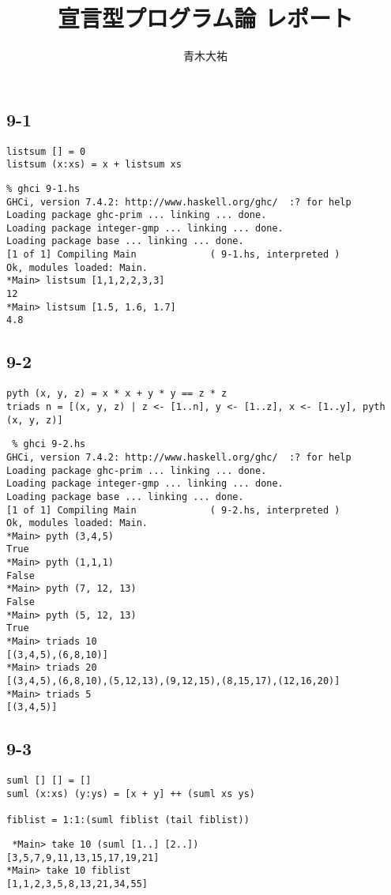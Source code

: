 \documentclass[a4paper]{jsarticle}
\author{青木大祐}
\title{宣言型プログラム論 レポート}
\begin{document}
\maketitle
\newpage
\subsection*{9-1}
\begin{lstlisting}
listsum [] = 0
listsum (x:xs) = x + listsum xs
\end{lstlisting}

\begin{lstlisting}
% ghci 9-1.hs 
GHCi, version 7.4.2: http://www.haskell.org/ghc/  :? for help
Loading package ghc-prim ... linking ... done.
Loading package integer-gmp ... linking ... done.
Loading package base ... linking ... done.
[1 of 1] Compiling Main             ( 9-1.hs, interpreted )
Ok, modules loaded: Main.
*Main> listsum [1,1,2,2,3,3]
12
*Main> listsum [1.5, 1.6, 1.7]
4.8
\end{lstlisting}

\subsection*{9-2}
\begin{lstlisting}
pyth (x, y, z) = x * x + y * y == z * z
triads n = [(x, y, z) | z <- [1..n], y <- [1..z], x <- [1..y], pyth (x, y, z)]
\end{lstlisting}

\begin{lstlisting}
 % ghci 9-2.hs
GHCi, version 7.4.2: http://www.haskell.org/ghc/  :? for help
Loading package ghc-prim ... linking ... done.
Loading package integer-gmp ... linking ... done.
Loading package base ... linking ... done.
[1 of 1] Compiling Main             ( 9-2.hs, interpreted )
Ok, modules loaded: Main.
*Main> pyth (3,4,5)
True
*Main> pyth (1,1,1)
False
*Main> pyth (7, 12, 13)
False
*Main> pyth (5, 12, 13)
True
*Main> triads 10
[(3,4,5),(6,8,10)]
*Main> triads 20
[(3,4,5),(6,8,10),(5,12,13),(9,12,15),(8,15,17),(12,16,20)]
*Main> triads 5
[(3,4,5)]
\end{lstlisting}

\subsection*{9-3}
\begin{lstlisting}
suml [] [] = []
suml (x:xs) (y:ys) = [x + y] ++ (suml xs ys)

fiblist = 1:1:(suml fiblist (tail fiblist))
\end{lstlisting}
\begin{lstlisting}
 *Main> take 10 (suml [1..] [2..])
[3,5,7,9,11,13,15,17,19,21]
*Main> take 10 fiblist
[1,1,2,3,5,8,13,21,34,55]

\end{lstlisting}
\end{document}
